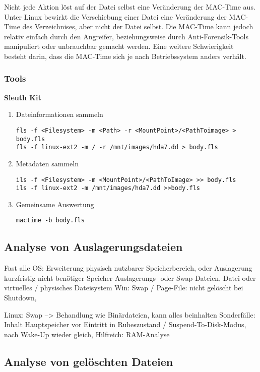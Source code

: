 Nicht jede Aktion löst auf der Datei selbst eine Veränderung der MAC-Time aus. Unter Linux bewirkt die Verschiebung einer Datei eine Veränderung der MAC-Time des Verzeichnises, aber nicht der Datei selbst. Die MAC-Time kann jedoch relativ einfach durch den Angreifer, beziehungsweise durch Anti-Forensik-Tools manipuliert oder unbrauchbar gemacht werden. Eine weitere Schwierigkeit besteht darin, dass die MAC-Time sich je nach Betriebssystem anders verhält.

\subsubsection{Tools}
\textbf{Sleuth Kit}
\begin{enumerate}
\item Dateinformationen sammeln
\begin{verbatim}
fls -f <Filesystem> -m <Path> -r <MountPoint>/<PathToimage> > body.fls
fls -f linux-ext2 -m / -r /mnt/images/hda7.dd > body.fls
\end{verbatim}

\item Metadaten sammeln
\begin{verbatim}
ils -f <Filesystem> -m <MountPoint>/<PathToImage> >> body.fls
ils -f linux-ext2 -m /mnt/images/hda7.dd >>body.fls
\end{verbatim}

\item Gemeinsame Auswertung
\begin{verbatim}
mactime -b body.fls
\end{verbatim}

\end{enumerate}


\subsection{Analyse von Auslagerungsdateien}
Fast alle OS: Erweiterung physisch nutzbarer Speicherbereich, oder Auslagerung kurzfristig nicht benötiger Speicher
Auslagerungs- oder Swap-Dateien, Datei oder virtuelles / physisches Dateisystem
Win: Swap / Page-File: nicht gelöscht bei Shutdown, 

Linux: Swap --> Behandlung wie Binärdateien, kann alles beinhalten
Sonderfälle: Inhalt Hauptspeicher vor Eintritt in Ruheszustand / Suspend-To-Disk-Modus, nach Wake-Up wieder gleich, Hilfreich: RAM-Analyse


\subsection{Analyse von gelöschten Dateien}

